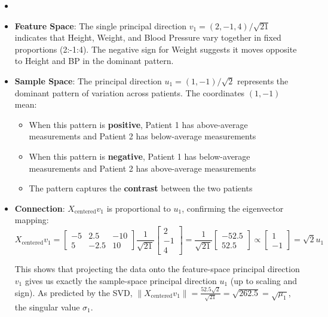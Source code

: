 \begin{notechapter}
\begin{remark}
\begin{itemize}
    \item []
    \item \textbf{Feature Space}: The single principal direction $v_1 = (2,-1,4)/\sqrt{21}$ indicates that Height, Weight, and Blood Pressure vary together in fixed proportions (2:-1:4). The negative sign for Weight suggests it moves opposite to Height and BP in the dominant pattern.
    
    \item \textbf{Sample Space}: The principal direction $u_1 = (1,-1)/\sqrt{2}$ represents the dominant pattern of variation across patients. The coordinates $(1,-1)$ mean:
    \begin{itemize}
        \item When this pattern is \textbf{positive}, Patient 1 has above-average measurements and Patient 2 has below-average measurements
        \item When this pattern is \textbf{negative}, Patient 1 has below-average measurements and Patient 2 has above-average measurements
        \item The pattern captures the \textbf{contrast} between the two patients
    \end{itemize}
    
    \item \textbf{Connection}: $X_{\text{centered}}v_1$ is proportional to $u_1$, confirming the eigenvector mapping:
    \[
    X_{\text{centered}}v_1 = \begin{bmatrix}
    -5 & 2.5 & -10 \\
    5 & -2.5 & 10
    \end{bmatrix}
    \frac{1}{\sqrt{21}}\begin{bmatrix}2\\-1\\4\end{bmatrix}
        = \frac{1}{\sqrt{21}}\begin{bmatrix}-52.5\\52.5\end{bmatrix}
    \propto \begin{bmatrix}1\\-1\end{bmatrix} = \sqrt{2}u_1
    \]
    
    This shows that projecting the data onto the feature-space principal direction $v_1$ gives us exactly the sample-space principal direction $u_1$ (up to scaling and sign). As predicted by the SVD, $\|X_{\text{centered}}v_1\| = \frac{52.5\sqrt{2}}{\sqrt{21}} = \sqrt{262.5} = \sqrt{\mu_1}$, the singular value $\sigma_1$.
\end{itemize}
\end{remark}


\end{notechapter}
